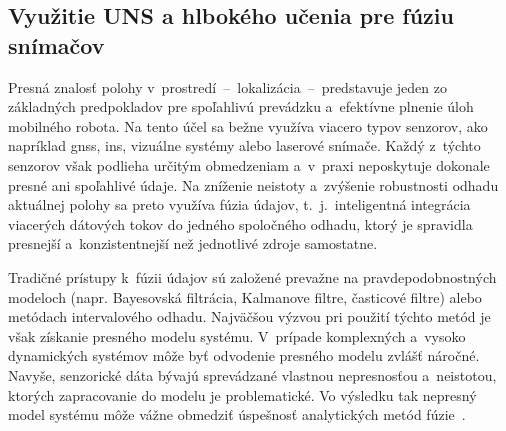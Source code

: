 




\subsection{Využitie UNS a hlbokého učenia pre fúziu snímačov}

  Presná znalosť polohy v~prostredí~--~lokalizácia~--~predstavuje jeden zo základných predpokladov pre spoľahlivú prevádzku a~efektívne plnenie úloh mobilného robota. Na tento účel sa bežne využíva viacero typov senzorov, ako napríklad \acrshort{gnss}, \acrshort{ins}, vizuálne systémy alebo laserové snímače. Každý z~týchto senzorov však podlieha určitým obmedzeniam a~v~praxi neposkytuje dokonale presné ani spoľahlivé údaje. Na zníženie neistoty a~zvýšenie robustnosti odhadu aktuálnej polohy sa preto využíva fúzia údajov, t.\ j.\ inteligentná integrácia viacerých dátových tokov do jedného spoločného odhadu, ktorý je spravidla presnejší a~konzistentnejší než jednotlivé zdroje samostatne.

  Tradičné prístupy k~fúzii údajov sú založené prevažne na pravdepodobnostných modeloch (napr. Bayesovská filtrácia, Kalmanove filtre, časticové filtre) alebo metódach intervalového odhadu. Najväčšou výzvou pri použití týchto metód je však získanie presného modelu systému. V~prípade komplexných a~vysoko dynamických systémov môže byť odvodenie presného modelu zvlášť náročné. Navyše, senzorické dáta bývajú sprevádzané vlastnou nepresnosťou a~neistotou, ktorých zapracovanie do modelu je problematické. Vo výsledku tak nepresný model systému môže vážne obmedziť úspešnosť analytických metód fúzie~\cite{fayyadDeepLearningSensor2020}. 
  
